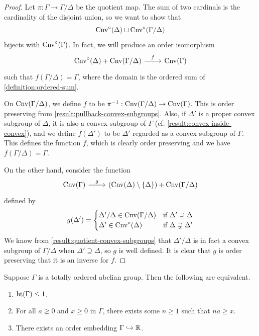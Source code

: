 \begin{proof}
	Let $\pi : \Gamma \to \Gamma/\Delta$ be the quotient map. The sum of two cardinals is the cardinality of the disjoint union, so we want to show that \[ \operatorname{Cnv}^\circ(\Delta) \sqcup \operatorname{Cnv}^\circ(\Gamma/\Delta) \] bijects with $\operatorname{Cnv}^\circ(\Gamma)$. In fact, we will produce an order isomorphism
	\[ \begin{tikzcd} \Convex^\circ(\Delta) + \Convex(\Gamma/\Delta) \ar{r}{f} & \Convex(\Gamma) \end{tikzcd} \] 
	such that $f(\Gamma/\Delta) = \Gamma$, where the domain is the ordered sum of \cref{definition:ordered-sum}. 
	
	On $\operatorname{Cnv}(\Gamma/\Delta)$, we define $f$ to be $\pi^{-1} : \operatorname{Cnv}(\Gamma/\Delta) \to \operatorname{Cnv}(\Gamma)$. This is order preserving from \cref{result:pullback-convex-subgroups}. Also, if $\Delta'$ is a proper convex subgroup of $\Delta$, it is also a convex subgroup of $\Gamma$ (cf. \cref{result:convex-inside-convex}), and we define $f(\Delta')$ to be $\Delta'$ regarded as a convex subgroup of $\Gamma$. This defines the function $f$, which is clearly order preserving and we have $f(\Gamma/\Delta) = \Gamma$. 
	
	On the other hand, consider the function 
	\[ \begin{tikzcd} \Convex(\Gamma) \ar{r}{g} & (\Convex(\Delta) \setminus \{\Delta\}) + \Convex(\Gamma/\Delta) \end{tikzcd} \] defined by
	\[ g(\Delta') = \begin{cases} \Delta'/\Delta \in \operatorname{Cnv}(\Gamma/\Delta) & \text{if } \Delta' \supseteq \Delta \\ 
	\Delta' \in \operatorname{Cnv}^\circ(\Delta) & \text{if } \Delta \supsetneq \Delta' \end{cases}  \]
	We know from \cref{result:quotient-convex-subgroups} that $\Delta'/\Delta$ is in fact a convex subgroup of $\Gamma/\Delta$ when $\Delta' \supseteq \Delta$, so $g$ is well defined. It is clear that $g$ is order preserving that it is an inverse for $f$. 
\end{proof}

\begin{lemma}
	\label{result:height-1-ordered-groups}

	Suppose $\Gamma$ is a totally ordered abelian group. Then the following are equivalent.
	\begin{enumerate}[label=(\alph{*})]
		\item $\operatorname{ht}(\Gamma) \leq 1$. 
		\item For all $a \gneq 0$ and $x \geq 0$ in $\Gamma$, there exists some $n \geq 1$ such that $na \geq x$. 
		\item There exists an order embedding $\Gamma \hookrightarrow \mathbb{R}$. 
	\end{enumerate}
\end{lemma}

